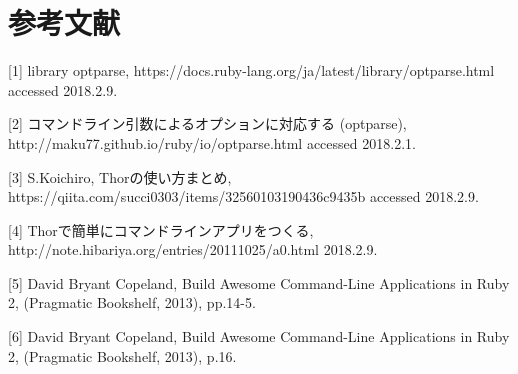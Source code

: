\chapter{参考文献}\label{ux53c2ux8003ux6587ux732e}

{[}1{]} library optparse,
https://docs.ruby-lang.org/ja/latest/library/optparse.html accessed
2018.2.9.

{[}2{]} コマンドライン引数によるオプションに対応する (optparse),
http://maku77.github.io/ruby/io/optparse.html accessed 2018.2.1.

{[}3{]} S.Koichiro, Thorの使い方まとめ,
https://qiita.com/succi0303/items/32560103190436c9435b accessed
2018.2.9.

{[}4{]} Thorで簡単にコマンドラインアプリをつくる,
http://note.hibariya.org/entries/20111025/a0.html 2018.2.9.

{[}5{]} David Bryant Copeland, Build Awesome Command-Line Applications
in Ruby 2, (Pragmatic Bookshelf, 2013), pp.14-5.

{[}6{]} David Bryant Copeland, Build Awesome Command-Line Applications
in Ruby 2, (Pragmatic Bookshelf, 2013), p.16.


    
    
    
    

